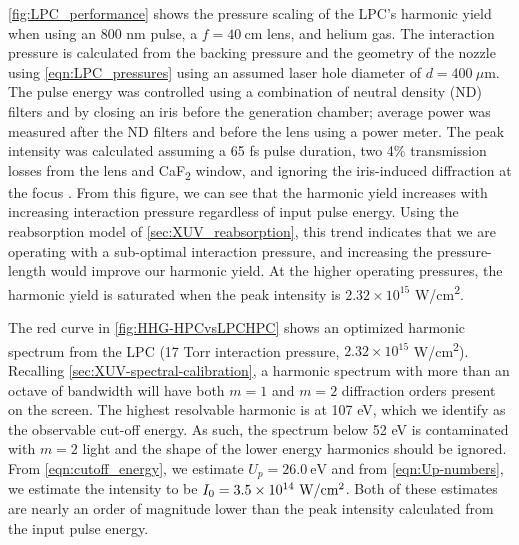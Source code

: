 \cref{fig:LPC_performance} shows the pressure scaling of the LPC's harmonic yield when using an 800 nm pulse, a $f = 40 \ \textrm{cm}$ lens, and helium gas. The interaction pressure is calculated from the backing pressure and the geometry of the nozzle using \cref{eqn:LPC_pressures} using an assumed laser hole diameter of $d = 400 \ \mu$m. The pulse energy was controlled using a combination of neutral density (ND) filters and by closing an iris before the generation chamber; average power was measured after the ND filters and before the lens using a power meter. The peak intensity was calculated assuming a 65 fs pulse duration, two 4\% transmission losses from the lens and CaF\textsubscript{2} window, and ignoring the iris-induced diffraction at the focus \cite{mahajanUniformGaussianBeams1986}. From this figure, we can see that the harmonic yield increases with increasing interaction pressure regardless of input pulse energy. Using the reabsorption model of \cref{sec:XUV_reabsorption}, this trend indicates that we are operating with a sub-optimal interaction pressure, and increasing the pressure-length would improve our harmonic yield. At the higher operating pressures, the harmonic yield is saturated when the peak intensity is $2.32 \times 10^{15}$ W/cm\textsuperscript{2}.

The red curve in \cref{fig:HHG-HPCvsLPCHPC} shows an optimized harmonic spectrum from the LPC (17 Torr interaction pressure, $2.32 \times 10^{15}$ W/cm\textsuperscript{2}). Recalling \cref{sec:XUV-spectral-calibration}, a harmonic spectrum with more than an octave of bandwidth will have both $m=1$ and $m=2$ diffraction orders present on the screen. The highest resolvable harmonic is at 107 eV, which we identify as the observable cut-off energy. As such, the spectrum below 52 eV is contaminated with ${m=2}$ light and the shape of the lower energy harmonics should be ignored. From \cref{eqn:cutoff_energy}, we estimate $U_p = 26.0 \ \textrm{eV}$ and from \cref{eqn:Up-numbers}, we estimate the intensity to be ${I_0 = 3.5 \times 10^{14} \ \textrm{W/cm\textsuperscript{2}}}$. Both of these estimates are nearly an order of magnitude lower than the peak intensity calculated from the input pulse energy.

